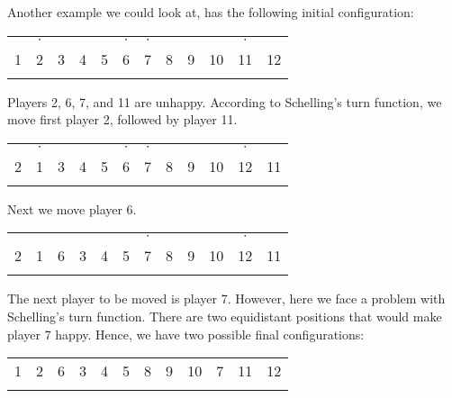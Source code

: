 \documentclass[../main.tex]{subfiles}
\begin{document}
Another example we could look at, has the following initial configuration:
\begin{table}[H]
\begin{center}
{\begin{tabular}{| c |c| c| c| c |c| c |c| c |c |c |c |}
\hline
 &$\cdot$ &  & & & $\cdot$ &$\cdot$  & & & &$\cdot$ & \\
1 & 2 &3 &4 &5 &6  &7 &8 &9 &10 &11 & 12 \\
\x & \x &\z &\z &\z &\x  &\x &\z &\z &\z &\x & \x \\
 \hline
\end{tabular}}
\end{center}
\end{table}
Players 2, 6, 7, and 11 are unhappy. According to Schelling's turn function, we move first player 2, followed by player 11.
\begin{table}[H]
\begin{center}
{\begin{tabular}{| c |c| c| c| c |c| c |c| c |c |c |c |}
\hline
 &$\cdot$ &  & & & $\cdot$ &$\cdot$  & & & &$\cdot$ & \\
2 & 1 &3 &4 &5 &6  &7 &8 &9 &10 &12 & 11 \\
\x & \x &\z &\z &\z &\x  &\x &\z &\z &\z &\x & \x \\
 \hline
\end{tabular}}
\end{center}
\end{table}

Next we move player 6.
\begin{table}[H]
\begin{center}
{\begin{tabular}{| c |c| c| c| c |c| c |c| c |c |c |c |}
\hline
 & &  & & &  &$\cdot$  & & & &$\cdot$ & \\
2 & 1 &6 &3 &4 &5  &7 &8 &9 &10 &12 & 11 \\
\x & \x &\x &\z &\z &\z  &\x &\z &\z &\z &\x & \x \\
 \hline
\end{tabular}}
\end{center}
\end{table}

The next player to be moved is player 7. However, here we face a problem with Schelling's turn function. There are two equidistant positions that would make player 7 happy. Hence, we have two possible final configurations:


\begin{table}[H]
\begin{center}
{\begin{tabular}{| c |c| c| c| c |c| c |c| c |c |c |c |}
\hline
1 & 2  &6&3 &4 &5  &8 &9 &10  &7 &11 & 12 \\
\x & \x&\x  &\z &\z &\z &\z &\z &\z &\x  &\x & \x \\
 \hline
\end{tabular}}
\end{center}
\end{table}
\end{document}
